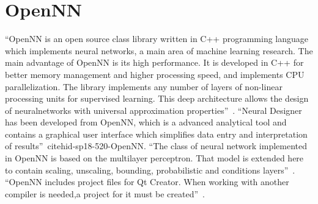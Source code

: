 \section{OpenNN}

“OpenNN is an open source class library written in C++ programming language
which implements neural networks, a main area of machine learning research.
The main advantage of OpenNN is its high performance. It is developed in 
C++ for better memory management and higher processing speed, and 
implements CPU parallelization. The library implements any number of layers
of non-linear processing units for supervised learning. This deep 
architecture allows the design of neuralnetworks with universal approximation
properties”~\cite{hid-sp18-520-OpenNN}.
“Neural Designer has been developed from OpenNN, which is a advanced analytical
tool and contains a graphical user interface which simplifies data entry
and interpretation of results”~cite{hid-sp18-520-OpenNN}.
“The class of neural network implemented in OpenNN is based on the multilayer 
perceptron. That model is extended here to contain scaling, unscaling, bounding,
probabilistic and conditions layers”~\cite{hid-sp18-520-OpenNNn}.
“OpenNN includes project files for Qt Creator. When working with another 
compiler is needed,a project for it must be created”~\cite{hid-sp18-520-OpenNNb}. 

